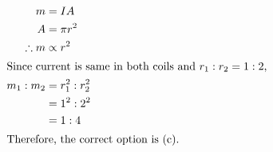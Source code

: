 \begin{solution}
    \begin{align*}
    m &= I A\\
    A &= \pi r^2\\
    \therefore m &\propto r^2\\
    \intertext{Since current is same in both coils and $r_1 : r_2 = 1 : 2$,}
    m_1 : m_2 &= r_1^2 : r_2^2\\
    &= 1^2 : 2^2\\
    &= 1 : 4\\
    \intertext{Therefore, the correct option is (c).}
    \end{align*}
\end{solution}
